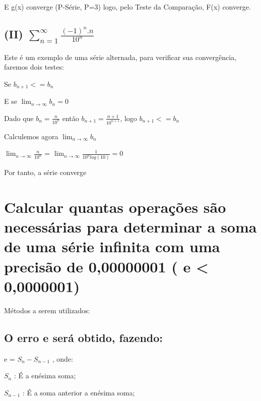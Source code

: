 \documentclass[11pt]{article}
\begin{document}
E g(x) converge (P-Série, P=3) logo, pelo Teste da Comparação, F(x)
converge.

\hypertarget{ii-sum_n1infty-frac-1n.n10n}{%
\subsection{\texorpdfstring{(II)
\(\sum_{n=1}^{\infty} \frac{(-1)^n.n}{10^n}\)}{(II) \textbackslash{}sum\_\{n=1\}\^{}\{\textbackslash{}infty\} \textbackslash{}frac\{(-1)\^{}n.n\}\{10\^{}n\}}}\label{ii-sum_n1infty-frac-1n.n10n}}

Este é um exemplo de uma série alternada, para verificar sua
convergência, faremos dois testes:

Se \(b_{n+1} <= b_{n}\)

E se \(\lim_{n\to\infty} b_{n} = 0\)

Dado que \(b_{n} = \frac{n}{10^n}\) então
\(b_{n+1} = \frac{n+1}{10^{n+1}}\), logo \(b_{n+1} <= b_{n}\)

Calculemos agora \(\lim_{n\to\infty} b_{n}\)

\(\lim_{n\to\infty} \frac{n}{10^n}\) =
\(\lim_{n\to\infty} \frac{1}{10^n log(10)} = 0\)

Por tanto, a série converge

    \hypertarget{calcular-quantas-operauxe7uxf5es-suxe3o-necessuxe1rias-para-determinar-a-soma-de-uma-suxe9rie-infinita-com-uma-precisuxe3o-de-000000001-e-00000001}{%
\section{Calcular quantas operações são necessárias para determinar a
soma de uma série infinita com uma precisão de 0,00000001 ( e
\textless{}
0,0000001)}\label{calcular-quantas-operauxe7uxf5es-suxe3o-necessuxe1rias-para-determinar-a-soma-de-uma-suxe9rie-infinita-com-uma-precisuxe3o-de-000000001-e-00000001}}

Métodos a serem utilizados:

\hypertarget{o-erro-e-seruxe1-obtido-fazendo}{%
\subsection{O erro e será obtido,
fazendo:}\label{o-erro-e-seruxe1-obtido-fazendo}}

e = \(S_{n} - S_{n-1}\) , onde:

\(S_{n}\) : É a enésima soma;

\(S_{n-1}\) : É a soma anterior a enésima soma;
\end{document}
